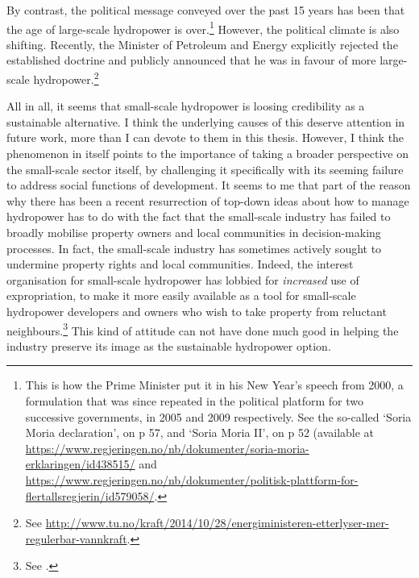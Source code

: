 By contrast, the political message conveyed over the past 15 years has been that the age of large-scale hydropower is over.\footnote{This is how the Prime Minister put it in his  New Year's speech from 2000, a formulation that was since repeated in the political platform for two successive governments, in 2005 and 2009 respectively. See the so-called `Soria Moria declaration', on p 57, and `Soria Moria II', on p 52 (available at \url{https://www.regjeringen.no/nb/dokumenter/soria-moria-erklaringen/id438515/} and \url{https://www.regjeringen.no/nb/dokumenter/politisk-plattform-for-flertallsregjerin/id579058/}.} However, the political climate is also shifting. Recently, the Minister of Petroleum and Energy explicitly rejected the established doctrine and publicly announced that he was in favour of more large-scale hydropower.\footnote{See \url{http://www.tu.no/kraft/2014/10/28/energiministeren-etterlyser-mer-regulerbar-vannkraft}.}

All in all, it seems that small-scale hydropower is loosing credibility as a sustainable alternative. I think the underlying causes of this deserve attention in future work, more than I can devote to them in this thesis. However, I think the phenomenon in itself points to the importance of taking a broader perspective on the small-scale sector itself, by challenging it specifically with its seeming failure to address social functions of development. It seems to me that part of the reason why there has been a recent resurrection of top-down ideas about how to manage hydropower has to do with the fact that the small-scale industry has failed to broadly mobilise property owners and local communities in decision-making processes. In fact, the small-scale industry has sometimes actively sought to undermine property rights and local communities. Indeed, the interest organisation for small-scale hydropower has lobbied for {\it increased} use of expropriation, to make it more easily available as a tool for small-scale hydropower developers and owners who wish to take property from reluctant neighbours.\footnote{See \cite{brekken07,brekken08}.} This kind of attitude can not have done much good in helping the industry preserve its image as the sustainable hydropower option.

